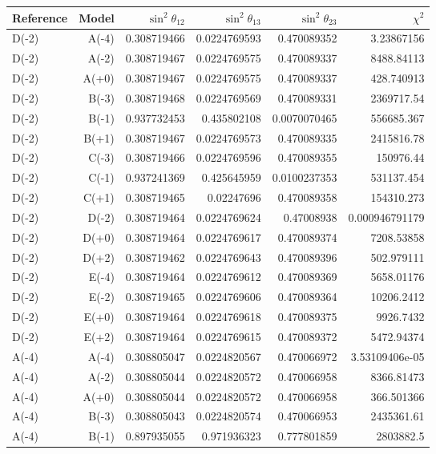\begin{table}[htbp]
\centering
\small
\setlength{\tabcolsep}{3.4pt}
\begin{tabular}{lrrrrr}
\hline
Reference & Model & $\sin^2\theta_{12}$ & $\sin^2\theta_{13}$ & $\sin^2\theta_{23}$ & $\chi^2$ \\
\hline
D(-2) & A(-4) & 0.308719466 & 0.0224769593 & 0.470089352 & 3.23867156 \\
D(-2) & A(-2) & 0.308719467 & 0.0224769575 & 0.470089337 & 8488.84113 \\
D(-2) & A(+0) & 0.308719467 & 0.0224769575 & 0.470089337 & 428.740913 \\
D(-2) & B(-3) & 0.308719468 & 0.0224769569 & 0.470089331 & 2369717.54 \\
D(-2) & B(-1) & 0.937732453 & 0.435802108 & 0.0070070465 & 556685.367 \\
D(-2) & B(+1) & 0.308719467 & 0.0224769573 & 0.470089335 & 2415816.78 \\
D(-2) & C(-3) & 0.308719466 & 0.0224769596 & 0.470089355 & 150976.44 \\
D(-2) & C(-1) & 0.937241369 & 0.425645959 & 0.0100237353 & 531137.454 \\
D(-2) & C(+1) & 0.308719465 & 0.02247696 & 0.470089358 & 154310.273 \\
D(-2) & D(-2) & 0.308719464 & 0.0224769624 & 0.47008938 & 0.000946791179 \\
D(-2) & D(+0) & 0.308719464 & 0.0224769617 & 0.470089374 & 7208.53858 \\
D(-2) & D(+2) & 0.308719462 & 0.0224769643 & 0.470089396 & 502.979111 \\
D(-2) & E(-4) & 0.308719464 & 0.0224769612 & 0.470089369 & 5658.01176 \\
D(-2) & E(-2) & 0.308719465 & 0.0224769606 & 0.470089364 & 10206.2412 \\
D(-2) & E(+0) & 0.308719464 & 0.0224769618 & 0.470089375 & 9926.7432 \\
D(-2) & E(+2) & 0.308719464 & 0.0224769615 & 0.470089372 & 5472.94374 \\
A(-4) & A(-4) & 0.308805047 & 0.0224820567 & 0.470066972 & 3.53109406e-05 \\
A(-4) & A(-2) & 0.308805044 & 0.0224820572 & 0.470066958 & 8366.81473 \\
A(-4) & A(+0) & 0.308805044 & 0.0224820572 & 0.470066958 & 366.501366 \\
A(-4) & B(-3) & 0.308805043 & 0.0224820574 & 0.470066953 & 2435361.61 \\
A(-4) & B(-1) & 0.897935055 & 0.971936323 & 0.777801859 & 2803882.5 \\

\end{tabular}
\end{table}
